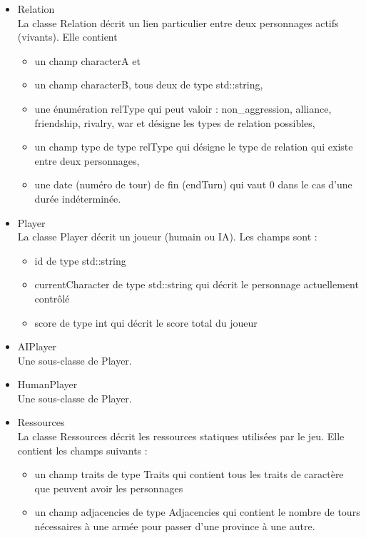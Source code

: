 \documentclass[a4paper,12pt]{article}
\begin{document}
\begin{itemize}
\item Relation\\
La classe Relation décrit un lien particulier entre deux personnages actifs (vivants). Elle contient 
\begin{itemize}
\item un champ characterA et 
\item un champ characterB, tous deux de type std::string,
\item une énumération relType qui peut valoir : {non\_aggression, alliance, friendship, rivalry, war} et désigne les types de relation possibles,
\item un champ type de type relType qui désigne le type de relation qui existe entre deux personnages,
\item une date (numéro de tour) de fin (endTurn) qui vaut 0 dans le cas d'une durée indéterminée.\\
\end{itemize}

\item Player\\
La classe Player décrit un joueur (humain ou IA).
Les champs sont :
\begin{itemize}
\item id de type std::string
\item currentCharacter de type std::string qui décrit le personnage actuellement contrôlé
\item score de type int qui décrit  le score total du joueur
\end{itemize}
\item AIPlayer\\
Une sous-classe de Player.
\item HumanPlayer\\
Une sous-classe de Player.\\

\item Ressources\\
La classe Ressources décrit les ressources statiques utilisées par le jeu. Elle contient les champs suivants :
\begin{itemize}
\item un champ traits de type Traits qui contient tous les traits de caractère que peuvent avoir les personnages
\item un champ adjacencies de type Adjacencies qui contient le nombre de tours nécessaires à une armée pour passer d'une province à une autre.\\
\end{itemize}


\end{itemize}
\end{document}
